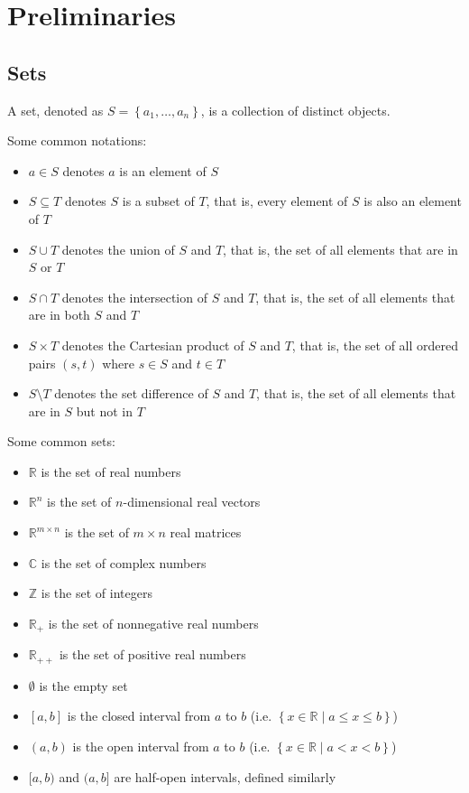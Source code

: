 \documentclass[11pt]{article}
\begin{document}
\newpage


\section{Preliminaries} 
\subsection{Sets}
A set, denoted as $S = \left\{ a_1, \ldots, a_n \right\}$, is a collection of distinct objects. \par
Some common notations: 
\begin{itemize}
    \item $a \in S$ denotes $a$ is an element of $S$
    \item $S \subseteq T$ denotes $S$ is a subset of $T$, that is, every element of $S$ is also an element of $T$
    \item $S \cup T$ denotes the union of $S$ and $T$, that is, the set of all elements that are in $S$ or $T$
    \item $S \cap T$ denotes the intersection of $S$ and $T$, that is, the set of all elements that are in both $S$ and $T$
    \item $S \times T$ denotes the Cartesian product of $S$ and $T$, that is, the set of all ordered pairs $(s, t)$ where $s \in S$ and $t \in T$
    \item $S \setminus T$ denotes the set difference of $S$ and $T$, that is, the set of all elements that are in $S$ but not in $T$
\end{itemize}  
Some common sets: 
\begin{itemize}
    \item $\mathbb{R}$ is the set of real numbers
    \item $\mathbb{R}^n$ is the set of $n$-dimensional real vectors
    \item $\mathbb{R}^{m\times n}$ is the set of $m \times n$ real matrices
    \item $\mathbb{C}$ is the set of complex numbers
    \item $\mathbb{Z}$ is the set of integers
    \item $\mathbb{R}_+$ is the set of nonnegative real numbers
    \item $\mathbb{R}_{++}$ is the set of positive real numbers
    \item $\emptyset$ is the empty set 
    \item $[a, b]$ is the closed interval from $a$ to $b$ (i.e. $\left\{ x \in \mathbb{R} \mid a \leq x \leq b \right\}$)
    \item $(a, b)$ is the open interval from $a$ to $b$ (i.e. $\left\{ x \in \mathbb{R} \mid a < x < b \right\}$)
    \item $[a, b)$ and $(a, b]$ are half-open intervals, defined similarly
\end{itemize}
\end{document}

